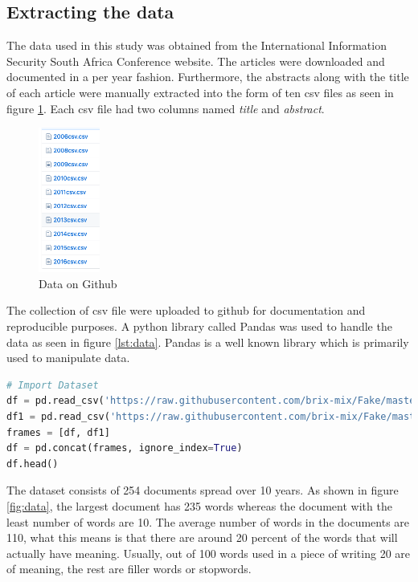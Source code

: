 \subsection{Extracting the data}

The data used in this study was obtained from the International Information Security South Africa Conference website. The articles were downloaded and documented in a per year fashion. Furthermore, the abstracts along with the title of each article were manually extracted into the form of ten csv files as seen in figure \ref{fig:github}. Each csv file had two columns named \textit{title} and \textit{abstract}.

\begin{figure}[h!]
\centering
\includegraphics[width=2cm]{./figures/github.png}
\caption{Data on Github}
\label{fig:github}
\end{figure}
The collection of csv file were uploaded to github for documentation and reproducible purposes. A python library called Pandas was used to handle the data as seen in figure \ref{lst:data}. Pandas is a well known library which is primarily used to manipulate data. 
\begin{lstlisting}[language=Python, label={lst:data}, caption=Importing data to the system]
# Import Dataset
df = pd.read_csv('https://raw.githubusercontent.com/brix-mix/Fake/master/2006csv.csv', usecols = ['abstracts','title'])
df1 = pd.read_csv('https://raw.githubusercontent.com/brix-mix/Fake/master/2008csv.csv', usecols = ['abstracts','title'])
frames = [df, df1]
df = pd.concat(frames, ignore_index=True)
df.head()
\end{lstlisting}
The dataset consists of 254 documents spread over 10 years. As shown in figure \ref{fig:data}, the largest document has 235 words whereas the document with the least number of words are 10. The average number of words in the documents are 110, what this means is that there are around 20 percent of the words that will actually have meaning. Usually, out of 100 words used in a piece of writing 20 are of meaning, the rest are filler words or stopwords.
